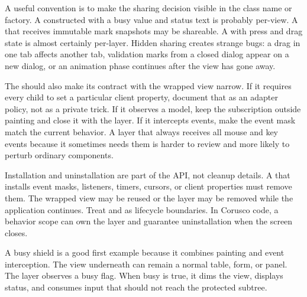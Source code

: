 A useful convention is to make the sharing decision visible in the class name or
factory. A  constructed with a busy value and status text is
probably per-view. A  that receives immutable mark
snapshots may be shareable. A  with press and drag state is
almost certainly per-layer. Hidden sharing creates strange bugs: a drag in one
tab affects another tab, validation marks from a closed dialog appear on a new
dialog, or an animation phase continues after the view has gone away.

The  should also make its contract with the wrapped view narrow.
If it requires every child to set a particular client property, document that as
an adapter policy, not as a private trick. If it observes a model, keep the
subscription outside painting and close it with the layer. If it intercepts
events, make the event mask match the current behavior. A layer that always
receives all mouse and key events because it sometimes needs them is harder to
review and more likely to perturb ordinary components.

Installation and uninstallation are part of the API, not cleanup details. A
 that installs event masks, listeners, timers, cursors, or client
properties must remove them. The wrapped view may be reused or the layer may be
removed while the application continues. Treat  and
 as lifecycle boundaries. In Corusco code, a behavior scope can
own the layer and guarantee uninstallation when the screen closes.

A busy shield is a good first  example because it combines painting and event interception. The view underneath can remain a normal table, form, or panel. The layer observes a busy flag. When busy is true, it dims the view, displays status, and consumes input that should not reach the protected subtree.

